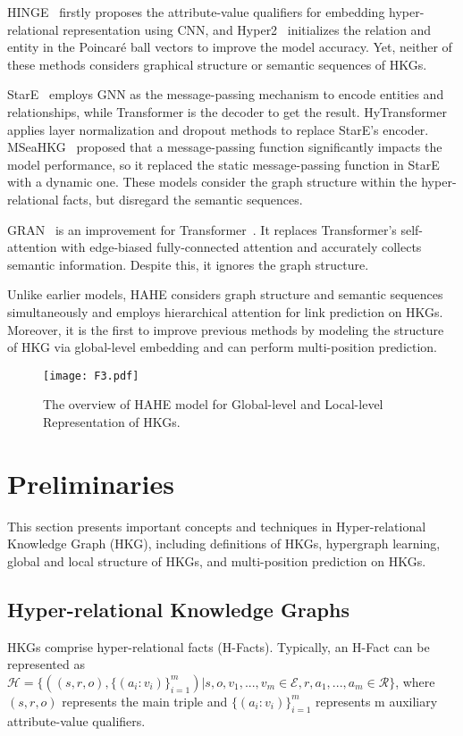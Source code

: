 \documentclass[11pt]{article}
\begin{document}
HINGE~\citep{HINGE} firstly proposes the attribute-value qualifiers for embedding hyper-relational representation using CNN, and Hyper2~\citep{Hyper2} initializes the relation and entity in the Poincar\'e ball vectors to improve the model accuracy. Yet, neither of these methods considers graphical structure or semantic sequences of HKGs.

StarE~\citep{StarE} employs GNN as the message-passing mechanism to encode entities and relationships, while Transformer is the decoder to get the result. HyTransformer~\cite{HyTransformer} applies layer normalization and dropout methods to replace StarE's encoder. MSeaHKG~\citep{MSeaHKG} proposed that a message-passing function significantly impacts the model performance, so it replaced the static message-passing function in StarE with a dynamic one. These models consider the graph structure within the hyper-relational facts, but disregard the semantic sequences.

GRAN~\citep{GRAN} is an improvement for Transformer~\citep{Transformer}. It replaces Transformer's self-attention with edge-biased fully-connected attention and accurately collects semantic information. Despite this, it ignores the graph structure.

Unlike earlier models, HAHE considers graph structure and semantic sequences simultaneously and employs hierarchical attention for link prediction on HKGs. Moreover, it is the first to improve previous methods by modeling the structure of HKG via global-level embedding and can perform multi-position prediction. 


\begin{figure*}[h!t]
\centering
\texttt{[image: F3.pdf]}
\caption{The overview of HAHE model for Global-level and Local-level Representation of HKGs.}
\label{HAHE}
\end{figure*}

\section{Preliminaries}

This section presents important concepts and techniques in Hyper-relational Knowledge Graph (HKG), including definitions of HKGs, hypergraph learning, global and local structure of HKGs, and multi-position prediction on HKGs.

\subsection{Hyper-relational Knowledge Graphs} 
HKGs comprise hyper-relational facts (H-Facts). Typically, an H-Fact can be represented as $\mathcal{H}=\{((s,r,o),\{(a_i:v_i)\}^m_{i=1})|s,o,v_1, ...,v_m\in\mathcal{E}, r,a_1,...,a_m\in\mathcal{R}\}$, where $(s,r,o)$ represents the main triple and $\{(a_i:v_i)\}^m_{i=1}$ represents m auxiliary attribute-value qualifiers. 
\end{document}
